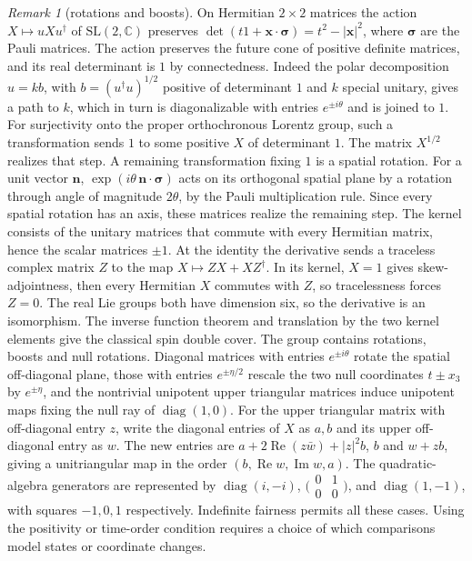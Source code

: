 \documentclass[11pt,reqno]{amsart}
\theoremstyle{definition}
\theoremstyle{remark}
\newtheorem{remark}[theorem]{Remark}
\numberwithin{equation}{section}
\begin{document}
\begin{remark}[rotations and boosts]\label{m1:spin}
On Hermitian \(2\times2\) matrices the action \(X\mapsto uXu^\dagger\)
of \(\mathrm{SL}(2,\mathbb C)\) preserves
\(\det(t1+\mathbf x\cdot\boldsymbol\sigma)=t^2-|\mathbf x|^2\),
where \(\boldsymbol\sigma\) are the Pauli matrices.
The action preserves the future cone of positive definite matrices,
and its real determinant is \(1\) by connectedness. Indeed the polar
decomposition \(u=kb\), with \(b=(u^\dagger u)^{1/2}\) positive of
determinant \(1\) and \(k\) special unitary, gives a path to \(k\),
which in turn is diagonalizable with entries \(e^{\pm i\theta}\)
and is joined to \(1\). For surjectivity onto the proper
orthochronous Lorentz group, such a transformation sends \(1\) to
some positive \(X\) of determinant \(1\). The matrix \(X^{1/2}\)
realizes that step. A remaining transformation fixing \(1\) is a
spatial rotation. For a unit vector \(\mathbf n\),
\(\exp(i\theta\,\mathbf n\cdot\boldsymbol\sigma)\) acts on its
orthogonal spatial plane by a rotation through angle of magnitude
\(2\theta\), by the Pauli multiplication rule. Since every spatial
rotation has an axis, these matrices realize the remaining step.
The kernel consists of the unitary matrices that commute with every
Hermitian matrix, hence the scalar matrices \(\pm1\).
At the identity the derivative sends a traceless complex matrix
\(Z\) to the map \(X\mapsto ZX+XZ^\dagger\). In its kernel,
\(X=1\) gives skew-adjointness, then every Hermitian \(X\)
commutes with \(Z\), so tracelessness forces \(Z=0\).
The real Lie groups both have dimension six, so the derivative
is an isomorphism. The inverse function theorem and translation by
the two kernel elements give the classical spin double cover. The group contains rotations, boosts
and null rotations. Diagonal matrices with entries \(e^{\pm i\theta}\)
rotate the spatial off-diagonal plane, those with entries
\(e^{\pm\eta/2}\) rescale the two null coordinates \(t\pm x_3\)
by \(e^{\pm\eta}\), and the nontrivial unipotent upper triangular
matrices induce unipotent maps fixing the null ray of
\(\operatorname{diag}(1,0)\). For the upper triangular matrix with
off-diagonal entry \(z\), write the diagonal entries of \(X\) as
\(a,b\) and its upper off-diagonal entry as \(w\). The new
entries are \(a+2\operatorname{Re}(z\bar w)+|z|^2 b\), \(b\)
and \(w+zb\), giving a unitriangular map in the order
\((b,\operatorname{Re}w,\operatorname{Im}w,a)\).
The quadratic-algebra generators are represented by
\(\operatorname{diag}(i,-i)\),
\(\bigl(\begin{smallmatrix}0&1\\0&0\end{smallmatrix}\bigr)\), and
\(\operatorname{diag}(1,-1)\), with squares \(-1,0,1\) respectively.
Indefinite fairness permits all these cases. Using the
positivity or time-order condition requires a choice of which
comparisons model states or coordinate changes.
\end{remark}
\end{document}

